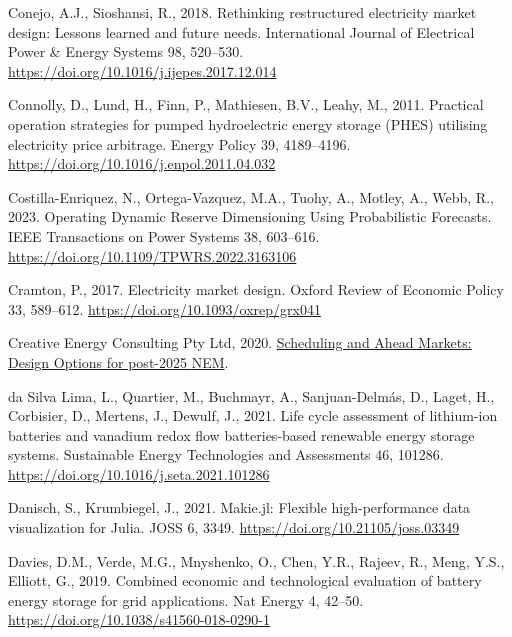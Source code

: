 \documentclass[12pt,a4paper,]{report}
\newlength{\cslhangindent}
\newenvironment{CSLReferences}[2] %
 {%
  \setlength{\parindent}{0pt}
  \ifodd #1 \everypar{\setlength{\hangindent}{\cslhangindent}}\ignorespaces\fi
  \ifnum #2 > 0
  \setlength{\parskip}{#2\baselineskip}
  \fi
 }%
 {}
\begin{document}
\begin{CSLReferences}{1}{0}
\leavevmode{}%
Conejo, A.J., Sioshansi, R., 2018. Rethinking restructured electricity
market design: {Lessons} learned and future needs. International Journal
of Electrical Power \& Energy Systems 98, 520--530.
\url{https://doi.org/10.1016/j.ijepes.2017.12.014}

\leavevmode{}%
Connolly, D., Lund, H., Finn, P., Mathiesen, B.V., Leahy, M., 2011.
Practical operation strategies for pumped hydroelectric energy storage
({PHES}) utilising electricity price arbitrage. Energy Policy 39,
4189--4196. \url{https://doi.org/10.1016/j.enpol.2011.04.032}

\leavevmode{}%
Costilla-Enriquez, N., Ortega-Vazquez, M.A., Tuohy, A., Motley, A.,
Webb, R., 2023. Operating {Dynamic Reserve Dimensioning Using
Probabilistic Forecasts}. IEEE Transactions on Power Systems 38,
603--616. \url{https://doi.org/10.1109/TPWRS.2022.3163106}

\leavevmode{}%
Cramton, P., 2017. Electricity market design. Oxford Review of Economic
Policy 33, 589--612. \url{https://doi.org/10.1093/oxrep/grx041}

\leavevmode{}%
Creative Energy Consulting Pty Ltd, 2020.
\href{https://www.energycouncil.com.au/media/18717/20200630-cec-final-report.pdf}{Scheduling
and {Ahead Markets}: {Design Options} for post-2025 {NEM}}.

\leavevmode{}%
da Silva Lima, L., Quartier, M., Buchmayr, A., Sanjuan-Delmás, D.,
Laget, H., Corbisier, D., Mertens, J., Dewulf, J., 2021. Life cycle
assessment of lithium-ion batteries and vanadium redox flow
batteries-based renewable energy storage systems. Sustainable Energy
Technologies and Assessments 46, 101286.
\url{https://doi.org/10.1016/j.seta.2021.101286}

\leavevmode{}%
Danisch, S., Krumbiegel, J., 2021. Makie.jl: {Flexible} high-performance
data visualization for {Julia}. JOSS 6, 3349.
\url{https://doi.org/10.21105/joss.03349}

\leavevmode{}%
Davies, D.M., Verde, M.G., Mnyshenko, O., Chen, Y.R., Rajeev, R., Meng,
Y.S., Elliott, G., 2019. Combined economic and technological evaluation
of battery energy storage for grid applications. Nat Energy 4, 42--50.
\url{https://doi.org/10.1038/s41560-018-0290-1}


\end{CSLReferences}
\end{document}
